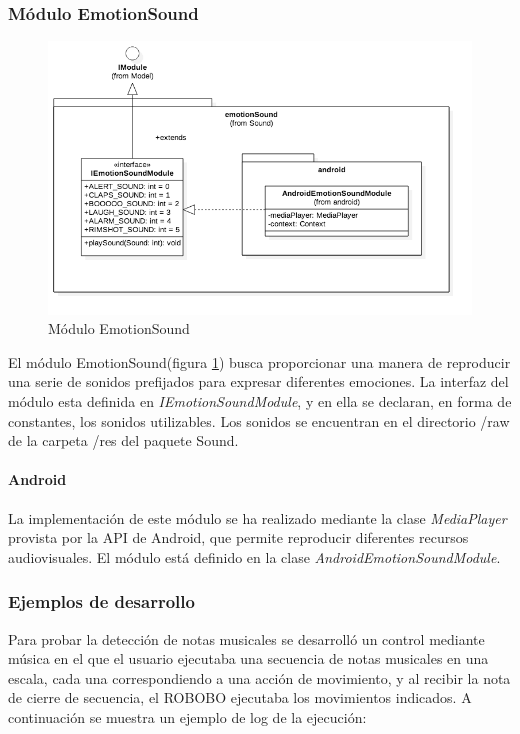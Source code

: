 \subsubsection{Módulo EmotionSound}
\begin{figure}
	\centering
	\includegraphics[width=1\linewidth]{imagenes/diagramas/EmotionSoundModule.png}
	\caption{Módulo EmotionSound}
	\label{fig:emotion-sound-module}
\end{figure}
El módulo EmotionSound(figura \ref{fig:emotion-sound-module}) busca proporcionar una manera de reproducir una serie de sonidos prefijados para expresar diferentes emociones.
La interfaz del módulo esta definida en \textit{IEmotionSoundModule}, y en ella se declaran, en forma de constantes, los sonidos utilizables.
Los sonidos se encuentran en el directorio /raw de la carpeta /res del paquete Sound.

\paragraph*{Android\\}

La implementación de este módulo se ha realizado mediante la clase \textit{MediaPlayer} provista por la API de Android, que permite reproducir diferentes recursos audiovisuales. El módulo está definido en la clase \textit{AndroidEmotionSoundModule}.


\subsubsection*{Ejemplos de desarrollo}

Para probar la detección de notas musicales se desarrolló un control mediante música en el que el usuario ejecutaba una secuencia de notas musicales en una escala, cada una correspondiendo a una acción de movimiento, y al recibir la nota de cierre de secuencia, el ROBOBO ejecutaba los movimientos indicados. A continuación se muestra un ejemplo de log de la ejecución:

